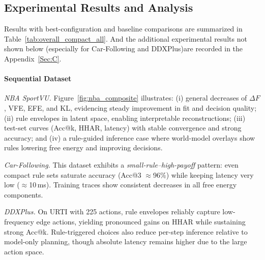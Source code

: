 \documentclass{article} %
\begin{document}


\subsection{Experimental Results and Analysis}
Results with best-configuration and baseline comparisons are summarized in Table~\ref{tab:overall_compact_all}. And the additional experimental results not shown below (especially for Car-Following and DDXPlus)are recorded in the Appendix~\ref{Sec:C}.


\paragraph{Sequential Dataset}

\textit{NBA SportVU.}
Figure~\ref{fig:nba_composite} illustrates: (i) general decreases of $\Delta F$, VFE, EFE, and KL, evidencing steady improvement in fit and decision quality; (ii) rule envelopes in latent space, enabling interpretable reconstructions; (iii) test-set curves (Acc@k, HHAR, latency) with stable convergence and strong accuracy; and (iv) a rule-guided inference case where 
world-model overlays show rules lowering free energy and improving decisions.

\textit{Car-Following.}
This dataset exhibits a \emph{small-rule–high-payoff} pattern: even compact rule sets saturate accuracy (Acc@3 $\approx$96\%) while keeping latency very low ($\approx$10\,ms). Training traces show consistent decreases in all free energy components. 

\textit{DDXPlus.}
On URTI with 225 actions, rule envelopes reliably capture low-frequency edge actions, yielding pronounced gains on HHAR while sustaining strong Acc@k. Rule-triggered choices also reduce per-step inference relative to model-only planning, though absolute latency remains higher due to the large action space.
\end{document}
